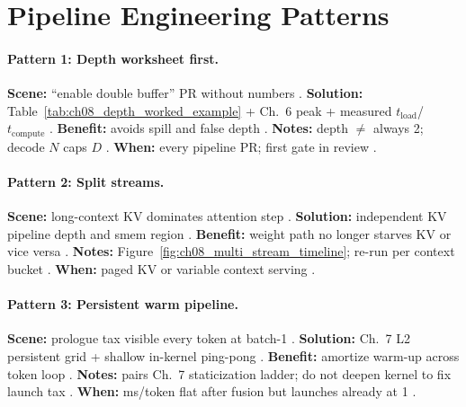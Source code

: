\section{Pipeline Engineering Patterns}
\label{sec:ch08_pipeline_patterns}

\paragraph{Pattern 1: Depth worksheet first.}
\textbf{Scene:} ``enable double buffer'' PR without numbers \citep{dao2022flashattention,yirage2026}.
\textbf{Solution:} Table~\ref{tab:ch08_depth_worked_example} + Ch.~6 peak + measured $t_{\mathrm{load}}$/$t_{\mathrm{compute}}$ \citep{chen2020compilerbasedhardw,shah2024flashattention3}.
\textbf{Benefit:} avoids spill and false depth \citep{memoryfloor2026,taxbreak2026}.
\textbf{Notes:} depth $\not=$ always 2; decode $N$ caps $D$ \citep{patel2025llminference,semianalysis2024tma}.
\textbf{When:} every pipeline PR; first gate in review \citep{yirage2026,chen2020compilerbasedhardw}.

\paragraph{Pattern 2: Split streams.}
\textbf{Scene:} long-context KV dominates attention step \citep{kwon2023vllm,dao2023flashdecoding}.
\textbf{Solution:} independent KV pipeline depth and smem region \citep{shah2024flashattention3,yirage2026}.
\textbf{Benefit:} weight path no longer starves KV or vice versa \citep{patel2025llminference,memoryfloor2026}.
\textbf{Notes:} Figure~\ref{fig:ch08_multi_stream_timeline}; re-run per context bucket \citep{semianalysis2024tma,taxbreak2026}.
\textbf{When:} paged KV or variable context serving \citep{kwon2023vllm,nvidia2024cudagraphs}.

\paragraph{Pattern 3: Persistent warm pipeline.}
\textbf{Scene:} prologue tax visible every token at batch-1 \citep{mpk2025,patel2025llminference}.
\textbf{Solution:} Ch.~7 L2 persistent grid + shallow in-kernel ping-pong \citep{shah2024flashattention3,nvidia2024cudagraphs}.
\textbf{Benefit:} amortize warm-up across token loop \citep{taxbreak2026,memoryfloor2026}.
\textbf{Notes:} pairs Ch.~7 staticization ladder; do not deepen kernel to fix launch tax \citep{yirage2026,mpk2025}.
\textbf{When:} ms/token flat after fusion but launches already at 1 \citep{patel2025llminference,dao2022flashattention}.

